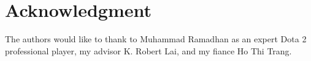 \section{Acknowledgment}
\label{sec:acknowledgment}

The authors would like to thank to Muhammad Ramadhan as an expert Dota 2 professional player, my advisor K. Robert Lai, and my fiance Ho Thi Trang.